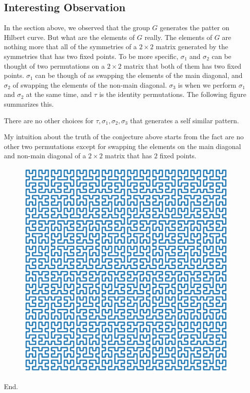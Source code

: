 \documentclass[12pt]{article}
\begin{document}
\subsection*{Interesting Observation}
In the section above, we observed that the group $ G $ generates the patter on Hilbert curve. But what are the elements of $ G $ really. The elements of $ G $ are nothing more that all of the symmetries of a $ 2\times 2 $ matrix generated by the symmetries that has two fixed points. To be more specific, $ \sigma_1 $ and $ \sigma_2 $ can be thought of two permutations on a $ 2\times 2 $ matrix that both of them has two fixed points. $ \sigma_1 $ can be though of as swapping the elements of the main diagonal, and $ \sigma_2 $ of swapping the elements of the non-main diagonal. $ \sigma_3 $ is when we perform $ \sigma_1 $ and $ \sigma_2 $ at the same time, and $ \tau $ is the identity permutations. The following figure summarizes this.
 
\begin{conjecture}
	There are no other choices for $ \tau, \sigma_1,\sigma_2, \sigma_3 $ that generates a self similar pattern.
\end{conjecture}
\begin{remark}
	My intuition about the truth of the conjecture above starts from the fact are no other two permutations except for swapping the elements on the main diagonal and non-main diagonal of a $ 2\times 2 $ matrix that has $ 2 $ fixed points. 
\end{remark}
\begin{figure}[h!]
	\centering
	\includegraphics[width=0.8\linewidth]{code/high_resolution_plot}
\end{figure}
\FloatBarrier
\noindent End.
\end{document}
